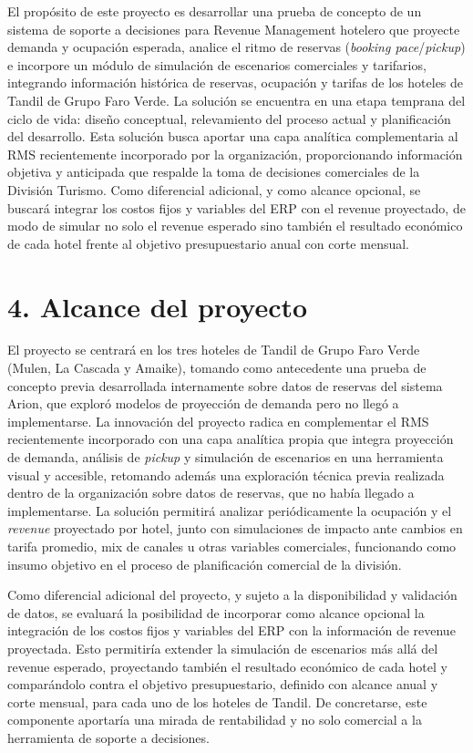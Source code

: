 \documentclass[
11pt, %
]{charter}
\begin{document}
El propósito de este proyecto es desarrollar una prueba de concepto de un sistema de soporte a decisiones para Revenue Management hotelero que proyecte demanda y ocupación esperada, analice el ritmo de reservas (\textit{booking pace}/\textit{pickup}) e incorpore un módulo de simulación de escenarios comerciales y tarifarios, integrando información histórica de reservas, ocupación y tarifas de los hoteles de Tandil de Grupo Faro Verde. La solución se encuentra en una etapa temprana del ciclo de vida: diseño conceptual,
relevamiento del proceso actual y planificación del desarrollo. Esta solución busca aportar una capa analítica complementaria al RMS recientemente incorporado por la organización, proporcionando información objetiva y anticipada que respalde la toma de decisiones comerciales de la División Turismo. Como diferencial adicional, y como alcance opcional, se buscará integrar los costos fijos y variables del ERP con el revenue proyectado, de modo de simular no solo el revenue esperado sino también el resultado económico de cada hotel frente al objetivo presupuestario anual con corte mensual.


\section{4. Alcance del proyecto}
\label{sec:alcance}

El proyecto se centrará en los tres hoteles de Tandil de Grupo Faro Verde (Mulen, La Cascada y Amaike), tomando como antecedente una prueba de concepto previa desarrollada internamente sobre datos de reservas del sistema Arion, que exploró modelos de proyección de demanda pero no llegó a implementarse. La innovación del proyecto radica en complementar el RMS recientemente incorporado con una capa analítica propia que integra proyección de demanda, análisis de \textit{pickup} y simulación de escenarios en una herramienta visual y accesible, retomando además una exploración técnica previa realizada dentro de la organización sobre datos de reservas, que no había llegado a implementarse. La solución permitirá analizar periódicamente la ocupación y el \textit{revenue} proyectado por hotel, junto con simulaciones de impacto ante cambios en tarifa promedio, mix de canales u otras variables comerciales, funcionando como insumo objetivo en el proceso de planificación comercial de la división.

Como diferencial adicional del proyecto, y sujeto a la disponibilidad y validación de datos, se evaluará la posibilidad de incorporar como alcance opcional la integración de los costos fijos y variables del ERP con la información de revenue proyectada. Esto permitiría extender la simulación de escenarios más allá del revenue esperado, proyectando también el resultado económico de cada hotel y comparándolo contra el objetivo presupuestario, definido con alcance anual y corte mensual, para cada uno de los hoteles de Tandil. De concretarse, este componente aportaría una mirada de rentabilidad y no solo comercial a la herramienta de soporte a decisiones.
\end{document}
